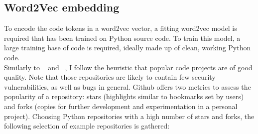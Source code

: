 \documentclass[
	a4paper,
	pagesize,
	pdftex,
	12pt,
	twoside, %
	BCOR=5mm, %
	ngerman,
	fleqn,
	final,
	]{scrartcl}
\begin{document}
\subsection{Word2Vec embedding}
To encode the code tokens in a word2vec vector, a fitting word2vec model is required that has been trained on Python source code. To train this model, a large training base of code is required, ideally made up of clean, working Python code.\\
Similarly to ~\cite{Bhoopchand.2016} and ~\cite{Allamanis.2013}, I follow the  heuristic that popular code projects are of good quality. Note that those repositories are likely to contain few security vulnerabilities, as well as bugs in general. Github offers two metrics to assess the popularity of a repository: stars (highlights similar to bookmarks set by users) and forks (copies for further development and experimentation in a personal project). Choosing Python repositories with a high number of stars and forks, the following selection of example repositories is gathered:
\end{document}
